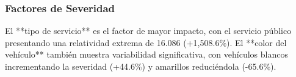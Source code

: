 \subsubsection{Factores de Severidad}
El **tipo de servicio** es el factor de mayor impacto, con el servicio público presentando una relatividad extrema de 16.086 (+1,508.6\%). El **color del vehículo** también muestra variabilidad significativa, con vehículos blancos incrementando la severidad (+44.6\%) y amarillos reduciéndola (-65.6\%).